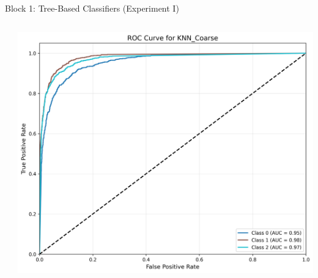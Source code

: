 \documentclass[9pt]{beamer}
\begin{document}
\begin{frame}{Block 1: Tree-Based Classifiers (Experiment I)}
\begin{columns}
\begin{column}{0.33\textwidth}
        \end{column}
        \begin{column}{0.33\textwidth}
            \centering
            \includegraphics[width=\textwidth]{code/ResultsMainAugZip/plots/Block1_Tree_Based_Experiment_I/roc_curve_KNN_Coarse.png}
        \end{column}
    \end{columns}
    \end{frame}
    
\end{document}
